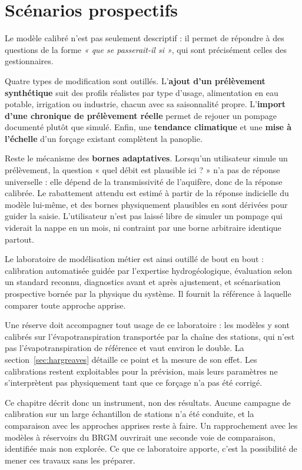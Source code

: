 \section{Scénarios prospectifs}

Le modèle calibré n'est pas seulement descriptif : il permet de répondre à des questions de la
forme \emph{« que se passerait-il si »}, qui sont précisément celles des gestionnaires.

Quatre types de modification sont outillés. L'\textbf{ajout d'un prélèvement synthétique} suit
des profils réalistes par type d'usage, alimentation en eau potable, irrigation ou industrie,
chacun avec sa saisonnalité propre. L'\textbf{import d'une chronique de prélèvement réelle}
permet de rejouer un pompage documenté plutôt que simulé. Enfin, une \textbf{tendance climatique}
et une \textbf{mise à l'échelle} d'un forçage existant complètent la panoplie.

Reste le mécanisme des \textbf{bornes adaptatives}. Lorsqu'un utilisateur
simule un prélèvement, la question « quel débit est plausible ici ? » n'a pas de réponse
universelle : elle dépend de la transmissivité de l'aquifère, donc de la réponse calibrée. Le
rabattement attendu est estimé à partir de la réponse indicielle du modèle lui-même, et des
bornes physiquement plausibles en sont dérivées pour guider la saisie. L'utilisateur n'est pas
laissé libre de simuler un pompage qui viderait la nappe en un mois, ni contraint par une borne
arbitraire identique partout.

Le laboratoire de modélisation métier est ainsi outillé de bout en bout : calibration
automatisée guidée par l'expertise hydrogéologique, évaluation selon un standard reconnu,
diagnostics avant et après ajustement, et scénarisation prospective bornée par la physique du
système. Il fournit la référence à laquelle comparer toute approche apprise.

Une réserve doit accompagner tout usage de ce laboratoire : les modèles y sont calibrés sur
l'évapotranspiration transportée par la chaîne des stations, qui n'est pas l'évapotranspiration
de référence et vaut environ le double. La section~\ref{sec:hargreaves} détaille ce point et la
mesure de son effet. Les calibrations restent exploitables pour la prévision, mais leurs
paramètres ne s'interprètent pas physiquement tant que ce forçage n'a pas été corrigé.

Ce chapitre décrit donc un instrument, non des résultats. Aucune campagne de calibration sur un
large échantillon de stations n'a été conduite, et la comparaison avec les approches apprises
reste à faire. Un rapprochement avec les modèles à réservoirs du BRGM ouvrirait une seconde voie
de comparaison, identifiée mais non explorée. Ce que ce laboratoire apporte, c'est la
possibilité de mener ces travaux sans les préparer.
